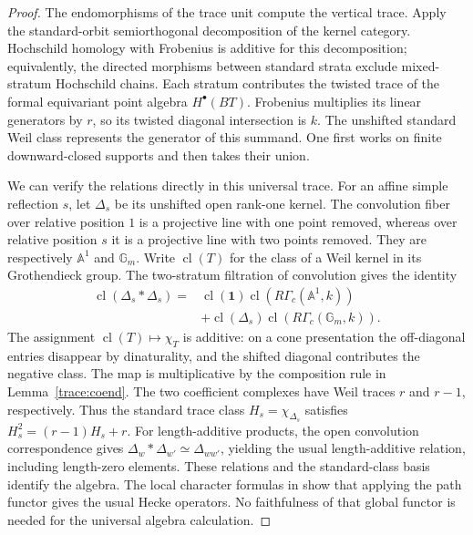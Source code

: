 \documentclass[11pt]{article}
\numberwithin{equation}{section}
\theoremstyle{definition}
\theoremstyle{remark}
\begin{document}
\begin{proof}
The endomorphisms of the trace unit compute the vertical trace.
Apply the standard-orbit semiorthogonal decomposition of the kernel
category.  Hochschild homology with Frobenius is additive for this
decomposition; equivalently, the directed morphisms between standard
strata exclude mixed-stratum Hochschild chains.  Each stratum
contributes the twisted trace of the formal equivariant point algebra
$H^\bullet(BT)$.  Frobenius multiplies its linear generators by $r$,
so its twisted diagonal intersection is $k$.  The unshifted standard
Weil class represents the generator of this summand.  One first works
on finite downward-closed supports and then takes their union.

We can verify the relations directly in this universal trace.
For an affine simple reflection $s$, let $\Delta_s$ be its unshifted
open rank-one kernel.  The convolution fiber over relative position
$1$ is a projective line with one point removed, whereas over
relative position $s$ it is a projective line with two points removed.
They are respectively $\mathbb A^1$ and $\mathbb G_m$.
Write $\operatorname{cl}(T)$ for the class of a Weil kernel in its
Grothendieck group.  The two-stratum filtration of convolution gives
the identity
\[
 \begin{split}
 \operatorname{cl}(\Delta_s*\Delta_s)
  ={}&\operatorname{cl}(\mathbf1)\operatorname{cl}(R\Gamma_c(\mathbb A^1,k))\\
     &+\operatorname{cl}(\Delta_s)\operatorname{cl}(R\Gamma_c(\mathbb G_m,k)).
 \end{split}
\]
The assignment $\operatorname{cl}(T)\mapsto\chi_T$ is additive:
on a cone presentation the off-diagonal entries disappear by
dinaturality, and the shifted diagonal contributes the negative
class.  The map is multiplicative by the composition rule in
Lemma~\ref{trace:coend}.  The two coefficient complexes have Weil
traces $r$ and $r-1$, respectively.  Thus the standard trace class
$H_s=\chi_{\Delta_s}$ satisfies $H_s^2=(r-1)H_s+r$.
For length-additive products, the open convolution correspondence
gives $\Delta_w*\Delta_{w'}\simeq\Delta_{ww'}$, yielding the usual
length-additive relation, including length-zero elements.
These relations and the standard-class basis identify the algebra.
The local character formulas in
\cite[Proposition~2.6]{Parent} show that applying the path functor
gives the usual Hecke operators.  No faithfulness of that global
functor is needed for the universal algebra calculation.
\end{proof}
\end{document}
